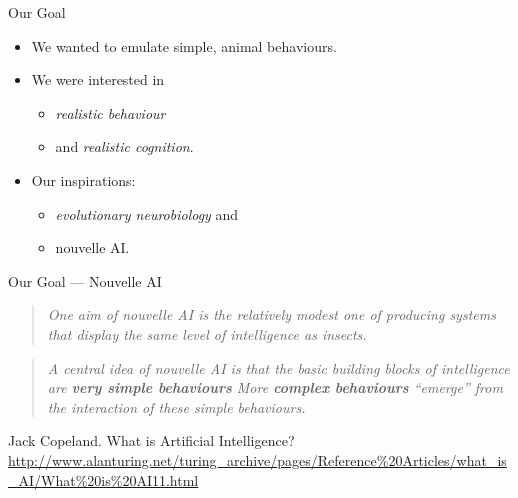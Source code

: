 \documentclass{beamer}
\begin{document}
   \begin{frame}{Our Goal}
      \begin{itemize}
         \item We wanted to emulate simple, animal behaviours.
         
         \pause
         
         \item We were interested in
         \begin{itemize}
            \item \emph{realistic behaviour}
            \item and \emph{realistic cognition}.
         \end{itemize}
         
         \pause
         
         \item Our inspirations:
         \begin{itemize}
            \item \emph{evolutionary neurobiology} and
            \item nouvelle AI.
         \end{itemize}
      \end{itemize}
   \end{frame}
   
   \begin{frame}{Our Goal --- Nouvelle AI}
      
         \begin{quote}\emph{
            One aim of nouvelle AI is the relatively modest one of producing systems that display the same level of intelligence as insects.
         }\end{quote}
         
        \begin{quote}\emph{
           A central idea of nouvelle AI is that the basic building blocks of intelligence are \textbf{very simple behaviours} {\upshape[$\dots$]} More \textbf{complex behaviours} ``emerge'' from the interaction of these simple behaviours.
         }\end{quote}

         Jack Copeland. What is Artificial Intelligence?\\
         {\footnotesize\url{http://www.alanturing.net/turing_archive/pages/Reference\%20Articles/what\_is\_AI/What\%20is\%20AI11.html}}
   \end{frame}
   
\end{document}
